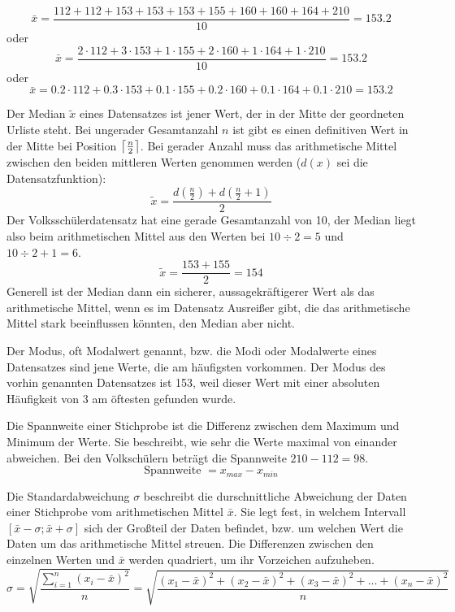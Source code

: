$$\bar{x} = \frac{112 + 112 + 153 + 153 + 153 + 155 + 160 + 160 + 164 + 210}{10} = 153.2$$ oder $$\bar{x} = \frac{2 \cdot 112 + 3 \cdot 153 + 1 \cdot 155 + 2 \cdot 160 + 1 \cdot 164 + 1 \cdot 210}{10} = 153.2$$ oder $$\bar{x} = 0.2 \cdot 112 + 0.3 \cdot 153 + 0.1 \cdot 155 + 0.2 \cdot 160 + 0.1 \cdot 164 + 0.1 \cdot 210 = 153.2$$


Der Median $\tilde{x}$ eines Datensatzes ist jener Wert, der in der Mitte der geordneten Urliste steht. Bei ungerader Gesamtanzahl $n$ ist gibt es einen definitiven Wert in der Mitte bei Position $\left\lceil \frac{n}{2} \right\rceil$. Bei gerader Anzahl muss das arithmetische Mittel zwischen den beiden mittleren Werten genommen werden ($d(x)$ sei die Datensatzfunktion): $$\tilde{x} = \frac{d(\frac{n}{2}) + d(\frac{n}{2} + 1)}{2}$$ Der Volkssch\"{u}lerdatensatz hat eine gerade Gesamtanzahl von 10, der Median liegt also beim arithmetischen Mittel aus den Werten bei $10 \div 2 = 5$ und $10 \div 2 + 1 = 6$. $$\tilde{x} = \frac{153 + 155}{2} = 154$$ Generell ist der Median dann ein sicherer, aussagekr\"{a}ftigerer Wert als das arithmetische Mittel, wenn es im Datensatz Ausrei\ss{}er gibt, die das arithmetische Mittel stark beeinflussen k\"{o}nnten, den Median aber nicht.

\pagebreak


Der Modus, oft Modalwert genannt, bzw. die Modi oder Modalwerte eines Datensatzes sind jene Werte, die am h\"{a}ufigsten vorkommen. Der Modus des vorhin genannten Datensatzes ist 153, weil dieser Wert mit einer absoluten H\"{a}ufigkeit von 3 am \"{o}ftesten gefunden wurde.



Die Spannweite einer Stichprobe ist die Differenz zwischen dem Maximum und Minimum der Werte. Sie beschreibt, wie sehr die Werte maximal von einander abweichen. Bei den Volksch\"{u}lern betr\"{a}gt die Spannweite $210 - 112 = 98$. $$\text{Spannweite } = x_{max} - x_{min}$$


Die Standardabweichung $\sigma$ beschreibt die durschnittliche Abweichung der Daten einer Stichprobe vom arithmetischen Mittel $\bar{x}$. Sie legt fest, in welchem Intervall $[\bar{x} - \sigma ; \bar{x} + \sigma]$ sich der Gro\ss{}teil der Daten befindet, bzw. um welchen Wert die Daten um das arithmetische Mittel streuen. Die Differenzen zwischen den einzelnen Werten und $\bar{x}$ werden quadriert, um ihr Vorzeichen aufzuheben. $$\sigma = \sqrt{\frac{\sum_{i=1}^{n} (x_{i} - \bar{x})^2}{n}} = \sqrt{\frac{(x_{1} - \bar{x})^2 + (x_{2} - \bar{x})^2 + (x_{3} - \bar{x})^2 + ... + (x_{n} - \bar{x})^2}{n}}$$

